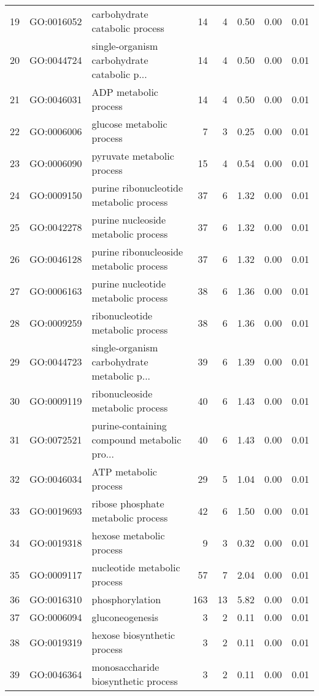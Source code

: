 \begin{table}[ht]
\begin{tabular}{rllrrrrr}
  19 & GO:0016052 & carbohydrate catabolic process &  14 &   4 & 0.50 & 0.00 & 0.01 \\ 
  20 & GO:0044724 & single-organism carbohydrate catabolic p... &  14 &   4 & 0.50 & 0.00 & 0.01 \\ 
  21 & GO:0046031 & ADP metabolic process &  14 &   4 & 0.50 & 0.00 & 0.01 \\ 
  22 & GO:0006006 & glucose metabolic process &   7 &   3 & 0.25 & 0.00 & 0.01 \\ 
  23 & GO:0006090 & pyruvate metabolic process &  15 &   4 & 0.54 & 0.00 & 0.01 \\ 
  24 & GO:0009150 & purine ribonucleotide metabolic process &  37 &   6 & 1.32 & 0.00 & 0.01 \\ 
  25 & GO:0042278 & purine nucleoside metabolic process &  37 &   6 & 1.32 & 0.00 & 0.01 \\ 
  26 & GO:0046128 & purine ribonucleoside metabolic process &  37 &   6 & 1.32 & 0.00 & 0.01 \\ 
  27 & GO:0006163 & purine nucleotide metabolic process &  38 &   6 & 1.36 & 0.00 & 0.01 \\ 
  28 & GO:0009259 & ribonucleotide metabolic process &  38 &   6 & 1.36 & 0.00 & 0.01 \\ 
  29 & GO:0044723 & single-organism carbohydrate metabolic p... &  39 &   6 & 1.39 & 0.00 & 0.01 \\ 
  30 & GO:0009119 & ribonucleoside metabolic process &  40 &   6 & 1.43 & 0.00 & 0.01 \\ 
  31 & GO:0072521 & purine-containing compound metabolic pro... &  40 &   6 & 1.43 & 0.00 & 0.01 \\ 
  32 & GO:0046034 & ATP metabolic process &  29 &   5 & 1.04 & 0.00 & 0.01 \\ 
  33 & GO:0019693 & ribose phosphate metabolic process &  42 &   6 & 1.50 & 0.00 & 0.01 \\ 
  34 & GO:0019318 & hexose metabolic process &   9 &   3 & 0.32 & 0.00 & 0.01 \\ 
  35 & GO:0009117 & nucleotide metabolic process &  57 &   7 & 2.04 & 0.00 & 0.01 \\ 
  36 & GO:0016310 & phosphorylation & 163 &  13 & 5.82 & 0.00 & 0.01 \\ 
  37 & GO:0006094 & gluconeogenesis &   3 &   2 & 0.11 & 0.00 & 0.01 \\ 
  38 & GO:0019319 & hexose biosynthetic process &   3 &   2 & 0.11 & 0.00 & 0.01 \\ 
  39 & GO:0046364 & monosaccharide biosynthetic process &   3 &   2 & 0.11 & 0.00 & 0.01 \\ 

\end{tabular}
\end{table}
